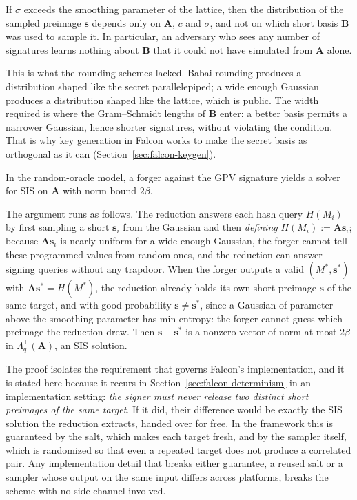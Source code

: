 \begin{proposition}
If $\sigma$ exceeds the smoothing parameter of the lattice, then the distribution of the sampled preimage $\mathbf{s}$ depends only on $\mathbf{A}$, $c$ and $\sigma$, and not on which short basis $\mathbf{B}$ was used to sample it. In particular, an adversary who sees any number of signatures learns nothing about $\mathbf{B}$ that it could not have simulated from $\mathbf{A}$ alone.
\end{proposition}

This is what the rounding schemes lacked. Babai rounding produces a distribution shaped like the secret parallelepiped; a wide enough Gaussian produces a distribution shaped like the lattice, which is public. The width required is where the Gram--Schmidt lengths of $\mathbf{B}$ enter: a better basis permits a narrower Gaussian, hence shorter signatures, without violating the condition. That is why key generation in Falcon works to make the secret basis as orthogonal as it can (Section~\ref{sec:falcon-keygen}).

\begin{proposition}
In the random-oracle model, a forger against the GPV signature yields a solver for SIS on $\mathbf{A}$ with norm bound $2\beta$.
\end{proposition}

The argument runs as follows. The reduction answers each hash query $H(M_i)$ by first sampling a short $\mathbf{s}_i$ from the Gaussian and then \emph{defining} $H(M_i) := \mathbf{A}\mathbf{s}_i$; because $\mathbf{A}\mathbf{s}_i$ is nearly uniform for a wide enough Gaussian, the forger cannot tell these programmed values from random ones, and the reduction can answer signing queries without any trapdoor. When the forger outputs a valid $(M^{*}, \mathbf{s}^{*})$ with $\mathbf{A}\mathbf{s}^{*} = H(M^{*})$, the reduction already holds its own short preimage $\mathbf{s}$ of the same target, and with good probability $\mathbf{s} \neq \mathbf{s}^{*}$, since a Gaussian of parameter above the smoothing parameter has min-entropy: the forger cannot guess which preimage the reduction drew. Then $\mathbf{s} - \mathbf{s}^{*}$ is a nonzero vector of norm at most $2\beta$ in $\Lambda^{\perp}_q(\mathbf{A})$, an SIS solution.

The proof isolates the requirement that governs Falcon's implementation, and it is stated here because it recurs in Section~\ref{sec:falcon-determinism} in an implementation setting: \emph{the signer must never release two distinct short preimages of the same target}. If it did, their difference would be exactly the SIS solution the reduction extracts, handed over for free. In the framework this is guaranteed by the salt, which makes each target fresh, and by the sampler itself, which is randomized so that even a repeated target does not produce a correlated pair. Any implementation detail that breaks either guarantee, a reused salt or a sampler whose output on the same input differs across platforms, breaks the scheme with no side channel involved.

